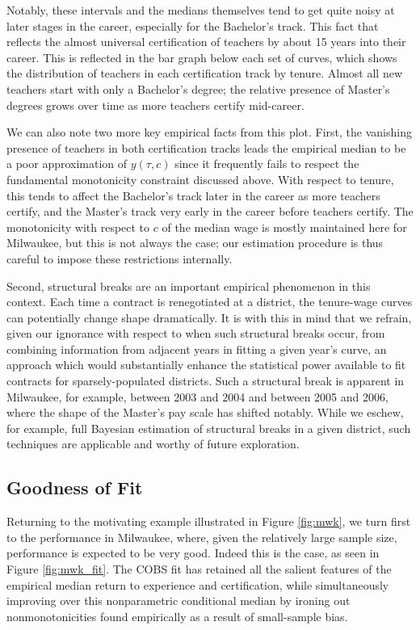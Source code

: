 \documentclass[12pt,]{article}
\begin{document}
Notably, these intervals and the medians themselves tend to get quite
noisy at later stages in the career, especially for the Bachelor's
track. This fact that reflects the almost universal certification of
teachers by about 15 years into their career. This is reflected in the
bar graph below each set of curves, which shows the distribution of
teachers in each certification track by tenure. Almost all new teachers
start with only a Bachelor's degree; the relative presence of Master's
degrees grows over time as more teachers certify mid-career.

We can also note two more key empirical facts from this plot. First, the
vanishing presence of teachers in both certification tracks leads the
empirical median to be a poor approximation of \(y(\tau, c)\) since it
frequently fails to respect the fundamental monotonicity constraint
discussed above. With respect to tenure, this tends to affect the
Bachelor's track later in the career as more teachers certify, and the
Master's track very early in the career before teachers certify. The
monotonicity with respect to \(c\) of the median wage is mostly
maintained here for Milwaukee, but this is not always the case; our
estimation procedure is thus careful to impose these restrictions
internally.

Second, structural breaks are an important empirical phenomenon in this
context. Each time a contract is renegotiated at a district, the
tenure-wage curves can potentially change shape dramatically. It is with
this in mind that we refrain, given our ignorance with respect to when
such structural breaks occur, from combining information from adjacent
years in fitting a given year's curve, an approach which would
substantially enhance the statistical power available to fit contracts
for sparsely-populated districts. Such a structural break is apparent in
Milwaukee, for example, between 2003 and 2004 and between 2005 and 2006,
where the shape of the Master's pay scale has shifted notably. While we
eschew, for example, full Bayesian estimation of structural breaks in a
given district, such techniques are applicable and worthy of future
exploration.

\subsection{Goodness of Fit}\label{goodness-of-fit}

Returning to the motivating example illustrated in Figure \ref{fig:mwk},
we turn first to the performance in Milwaukee, where, given the
relatively large sample size, performance is expected to be very good.
Indeed this is the case, as seen in Figure \ref{fig:mwk_fit}. The COBS
fit has retained all the salient features of the empirical median return
to experience and certification, while simultaneously improving over
this nonparametric conditional median by ironing out nonmonotonicities
found empirically as a result of small-sample bias.
\end{document}
